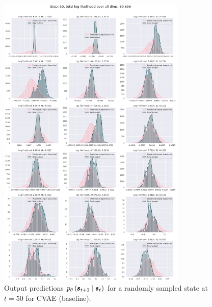 \begin{figure}
    \centering
    \includegraphics[width=0.8\textwidth]{img/windyslope/output/windyslope_output_baseline_step50.png}
    \caption{Output predictions $\ptheta \protect\given*{\vns}{\vs}$ for a randomly sampled state at $t=50$ for CVAE (baseline).}
    \label{fig:output_distribution_step50_posvel_baseline}
\end{figure}

